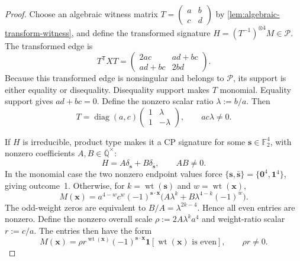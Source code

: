\documentclass[11pt,letterpaper,onecolumn]{article}
\theoremstyle{plain}
\theoremstyle{definition}
\theoremstyle{remark}
\newcommand{\AlgNums}{\overline{\mathbb Q}}
\newcommand{\Ftwo}{\mathbb F_2}
\newcommand{\cP}{\mathscr P}
\newcommand{\diag}{\operatorname{diag}}
\newcommand{\wt}{\operatorname{wt}}
\newcommand{\one}{\mathbf 1}
\newcommand{\zero}{\mathbf 0}
\begin{document}
\begin{proof}
Choose an algebraic witness matrix
\(T=(\begin{smallmatrix}a&b\\c&d\end{smallmatrix})\) by
\cref{lem:algebraic-transform-witness}, and define the transformed signature
\(H=(T^{-1})^{\otimes4}M\in\cP\).  The transformed edge is
\[
 T^{\mathsf T}XT=
 \begin{pmatrix}2ac&ad+bc\\ad+bc&2bd\end{pmatrix}.
\]
Because this transformed edge is nonsingular and belongs to \(\cP\), its
support is either equality or disequality.  Disequality support makes
\(T\) monomial.  Equality support gives \(ad+bc=0\). Define the nonzero
scalar ratio \(\lambda:=b/a\).  Then
\[
 T=\diag(a,c)\begin{pmatrix}1&\lambda\\1&-\lambda\end{pmatrix},
 \qquad ac\lambda\ne0.
\]

If \(H\) is irreducible, product type makes it a CP signature
for some \({\mathbf{s}}\in\Ftwo^4\), with nonzero coefficients
\(A,B\in\AlgNums^\times\):
\[
 H=A\delta_{\mathbf{s}}+B\delta_{\bar {\mathbf{s}}},\qquad AB\ne0.
\]
In the monomial case the two nonzero endpoint values force
\(\{{\mathbf{s}},\bar {\mathbf{s}}\}=\{\zero^4,\one^4\}\), giving outcome~1.  Otherwise, for
\(k=\wt({\mathbf{s}})\) and \(w=\wt({\mathbf{x}})\),
\[
 M({\mathbf{x}})=a^{4-w}c^w(-1)^{{\mathbf{s}}\cdot {\mathbf{x}}}
 \bigl(A\lambda^k+B\lambda^{4-k}(-1)^w\bigr).
\]
The odd-weight zeros are equivalent to \(B/A=\lambda^{2k-4}\).  Hence all
even entries are nonzero.  Define the nonzero overall scale
\(\rho:=2A\lambda^k a^4\) and weight-ratio scalar \(r:=c/a\). The entries
then have the form
\begin{equation}
 M({\mathbf{x}})=\rho r^{\wt({\mathbf{x}})}(-1)^{{\mathbf{s}}\cdot {\mathbf{x}}}
 \one[\wt({\mathbf{x}})\text{ is even}],\qquad \rho r\ne0.
 \label{eq:p1-eight-vertex-product-dense-form}
\end{equation}


\end{proof}
\end{document}
